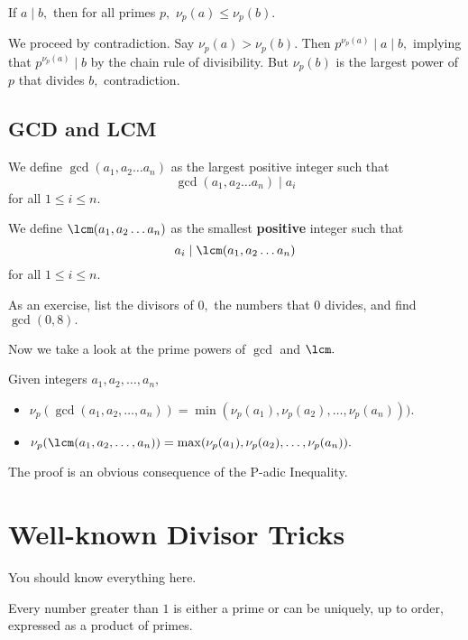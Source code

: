 \documentclass[mast]{lucky}
\begin{document}
\begin{fact}
If $a\mid b,$ then for all primes $p,$ $\nu_p(a)\leq \nu_p(b).$
\end{fact}

\begin{pro}
We proceed by contradiction. Say $\nu_p(a)>\nu_p(b).$ Then $p^{\nu_p(a)}\mid a\mid b,$ implying that $p^{\nu_p(a)}\mid b$ by the chain rule of divisibility. But $\nu_p(b)$ is the largest power of $p$ that divides $b,$ contradiction.
\end{pro}

\subsection{GCD and LCM}
\begin{defi}We define $\gcd(a_1,a_2\dots a_n)$ as the largest positive integer such that \[\gcd(a_1,a_2\dots a_n)\mid a_i\] for all $1\leq i\leq n.$\end{defi}

\begin{defi}We define $\lcm(a_1,a_2\dots a_n)$ as the smallest \textbf{positive} integer such that \[a_i\mid \lcm(a_1,a_2\dots a_n)\] for all $1\leq i\leq n.$\end{defi}
As an exercise, list the divisors of $0,$ the numbers that $0$ divides, and find $\gcd(0,8).$

Now we take a look at the prime powers of $\gcd$ and $\lcm.$
\begin{fact}
Given integers $a_1,a_2,\ldots,a_n,$
\begin{itemize}
\item $\nu_p(\gcd(a_1,a_2,\ldots,a_n))=\min(\nu_p(a_1),\nu_p(a_2),\ldots,\nu_p(a_n))).$
\item $\nu_p(\lcm(a_1,a_2,\ldots,a_n))=\max(\nu_p(a_1),\nu_p(a_2),\ldots,\nu_p(a_n)).$
\end{itemize}
\end{fact}

The proof is an obvious consequence of the P-adic Inequality.

\section{Well-known Divisor Tricks}
You should know everything here.

\begin{theo}
Every number greater than $1$ is either a prime or can be uniquely, up to order, expressed as a product of primes.
\end{theo}
\end{document}
